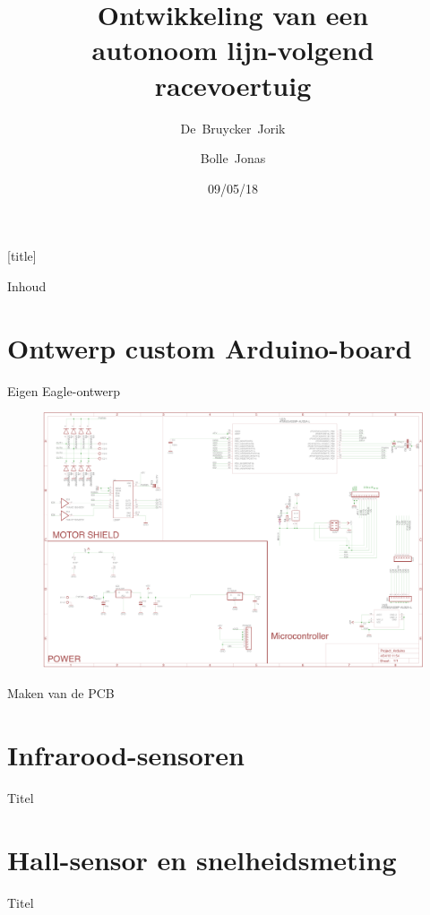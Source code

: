 \documentclass[t,12pt,english
\ifx\beamermode\undefined\else,\beamermode\fi
]{beamer}
\title{Ontwikkeling van een\\autonoom lijn-volgend\\racevoertuig}
\author{\mbox{De Bruycker Jorik} \and \mbox{Bolle Jonas}}
\date{09/05/18}
\institute{3ELICTE}
\begin{document}
[title]

\begin{frame}
    \titlepage
\end{frame}

\usedefaultcanvas

\emptyfooter
\begin{frame}[noframenumbering]{Inhoud}
        \tableofcontents
    \end{frame}
\largefooter

\section{Ontwerp custom Arduino-board}\label{sec:pcb}

\begin{frame}{Eigen Eagle-ontwerp}
\begin{figure}[H]
	\centering
	\includegraphics[width=\textwidth]{eigenschematic.png}
\end{figure}
\end{frame}

\begin{frame}{Maken van de PCB}

\end{frame}

\section{Infrarood-sensoren}
\begin{frame}{Titel}

\end{frame}
\section{Hall-sensor en snelheidsmeting}
\begin{frame}{Titel}

\end{frame}
\end{document}
